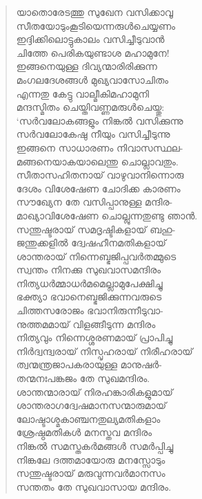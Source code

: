 \begin{verse}
യാതൊരേടത്തു സുഖേന വസിക്കാവൂ\\
സീതയോടുംകൂടിയെന്നരുള്‍ചെയ്യണം\\
ഇദ്ദിക്കിലൊട്ടുകാലം വസിച്ചീടുവാന്‍\\
ചിത്തേ പെരികയുണ്ടാശ മഹാമുനേ!\\
ഇങ്ങനെയുള്ള ദിവ്യന്മാരിരിക്കുന്ന\\
മംഗലദേശങ്ങള്‍ മുഖ്യവാസോചിതം\\
എന്നതു കേട്ടു വാല്മീകിമഹാമുനി\\
മന്ദസ്മിതം ചെയ്തിവണ്ണമരുള്‍ചെയ്തു:\\
‘സര്‍വലോകങ്ങളും നിങ്കല്‍ വസിക്കുന്നു\\
സര്‍വലോകേഷു നീയും വസിച്ചീടുന്നു\\
ഇങ്ങനെ സാധാരണം നിവാസസ്ഥല-\\
മങ്ങനെയാകയാലെന്തു ചൊല്ലാവതും.\\
സീതാസഹിതനായ് വാഴുവാനിന്നൊരു\\
ദേശം വിശേഷേണ ചോദിക്ക കാരണം\\
സൗഖ്യേന തേ വസിപ്പാനുള്ള മന്ദിര-\\
മാഖ്യാവിശേഷേണ ചൊല്ലുന്നതുണ്ടു ഞാന്‍.\\
സന്തുഷ്ടരായ് സമദൃഷ്ടികളായ് ബഹു-\\
ജന്തുക്കളില്‍ ദ്വേഷഹീനമതികളായ്\\
ശാന്തരായ് നിന്നെബ്ഭജിപ്പവര്‍തമ്മുടെ\\
സ്വന്തം നിനക്കു സുഖവാസമന്ദിരം\\
നിത്യധര്‍മ്മാധര്‍മമെല്ലാമുപേക്ഷിച്ചു\\
ഭക്ത്യാ ഭവാനെബ്ഭജിക്കുന്നവരുടെ\\
ചിത്തസരോജം ഭവാനിരുന്നീടുവാ-\\
നുത്തമമായ് വിളങ്ങീടുന്ന മന്ദിരം\\
നിത്യവും നിന്നെശ്ശരണമായ് പ്രാപിച്ചു\\
നിര്‍ദ്വന്ദ്വരായ് നിസ്പൃഹരായ് നിരീഹരായ്\\
ത്വന്മന്ത്രജാപകരായുള്ള മാനുഷര്‍-\\
തന്മനഃപങ്കജം തേ സുഖമന്ദിരം.\\
ശാന്തന്മാരായ് നിരഹങ്കാരികളുമായ്\\
ശാന്തരാഗദ്വേഷമാനസന്മാരുമായ്\\
ലോഷ്ടാശ്മകാഞ്ചനതുല്യമതികളാം\\
ശ്രേഷ്ഠമതികള്‍ മനസ്തവ മന്ദിരം\\
നിങ്കല്‍ സമസ്തകര്‍മങ്ങള്‍ സമര്‍പ്പിച്ചു\\
നിങ്കലേ ദത്തമായോരു മനസ്സോടും\\
സന്തുഷ്ടരായ് മരുവുന്നവര്‍മാനസം\\
സന്തതം തേ സുഖവാസായ മന്ദിരം.\\

\end{verse}

